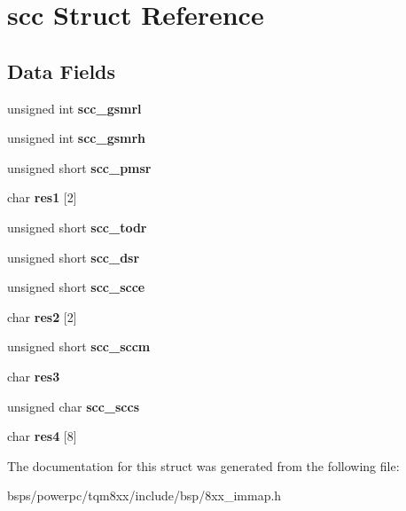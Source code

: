 \hypertarget{structscc}{}\section{scc Struct Reference}
\label{structscc}
\subsection*{Data Fields}
\begin{DoxyCompactItemize}
\item 
\mbox{\label{structscc_a59b4115d7478a0c11edba34f1c8791f3}} 
unsigned int {\bfseries scc\+\_\+gsmrl}
\item 
\mbox{\label{structscc_a0a6e4d166917aaccbcb9ad657681c7fa}} 
unsigned int {\bfseries scc\+\_\+gsmrh}
\item 
\mbox{\label{structscc_a3317b2697a25356bc779cff88a19a361}} 
unsigned short {\bfseries scc\+\_\+pmsr}
\item 
\mbox{\label{structscc_acc95f4ebc14949d0f9566451441e19ba}} 
char {\bfseries res1} \mbox{[}2\mbox{]}
\item 
\mbox{\label{structscc_a67dca2e580bbef3a1e03da7ed607411a}} 
unsigned short {\bfseries scc\+\_\+todr}
\item 
\mbox{\label{structscc_a1d45e8b22e107ad2a4ecdad11371a55a}} 
unsigned short {\bfseries scc\+\_\+dsr}
\item 
\mbox{\label{structscc_a02179c1b94af34015ec0035fbde3f92c}} 
unsigned short {\bfseries scc\+\_\+scce}
\item 
\mbox{\label{structscc_a948bd9c4bb256b56e4eef98479308f90}} 
char {\bfseries res2} \mbox{[}2\mbox{]}
\item 
\mbox{\label{structscc_a54f51b96107f351bc7db6d38d90e2eac}} 
unsigned short {\bfseries scc\+\_\+sccm}
\item 
\mbox{\label{structscc_acb45aebb2c6b4802b716aecf845019a0}} 
char {\bfseries res3}
\item 
\mbox{\label{structscc_abd65c97603671eac22006722a0696fb1}} 
unsigned char {\bfseries scc\+\_\+sccs}
\item 
\mbox{\label{structscc_a3e065d28a0b58c645ee8c893d0bf4843}} 
char {\bfseries res4} \mbox{[}8\mbox{]}
\end{DoxyCompactItemize}


The documentation for this struct was generated from the following file\+:\begin{DoxyCompactItemize}
\item 
bsps/powerpc/tqm8xx/include/bsp/8xx\+\_\+immap.\+h\end{DoxyCompactItemize}
